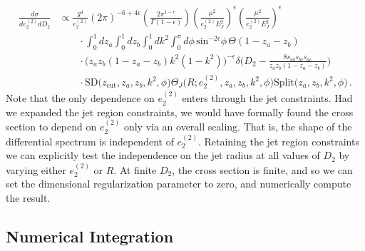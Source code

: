 \documentclass[a4paper,11pt]{article}
\newcommand{\ecf}[2]{e_{#1}^{(#2)}}
\newcommand{\nn}{\nonumber}
\def\zcut{z_{\text{cut}}}
\begin{document}
{\small\begin{align}
\frac{d\sigma}{d\ecf{2}{2} dD_2}&\propto \frac{g^4}{\ecf{2}{2}}(2\pi)^{-6+4\epsilon}\left(\frac{2\pi^{1-\epsilon}}{\Gamma(1-\epsilon)}\right)\left(\frac{\mu^2}{\ecf{2}{2}E_J^2}\right)^{\epsilon}\left(\frac{\mu^2}{\ecf{2}{2}E_J^2}\right)^{\epsilon} \nn \\
&\qquad \cdot \int_0^1dz_a\int_0^1dz_b\int_0^1dk^2\int_0^{\pi}d\phi\,\text{sin}^{-2\epsilon}\phi\,\Theta(1-z_a-z_b)\nonumber\\
&\qquad \cdot\Big(z_az_b(1-z_a-z_b)k^2(1-k^2)\Big)^{-\epsilon}\delta\Bigg(D_2-\frac{8s_{ab}s_{bc}s_{ac}}{z_az_b(1-z_a-z_b)}\Bigg)\nonumber\\
&\qquad\cdot\text{SD}\Big(\zcut,z_a,z_b,k^2,\phi\Big)\Theta_{J}\Big(R;\ecf{2}{2},z_a,z_b,k^2,\phi\Big)\text{Split}\Big(z_a,z_b,k^2,\phi\Big)\,.
\end{align}}
Note that the only dependence on $\ecf{2}{2}$ enters through the jet constraints. Had we expanded the jet region constraints, we would have formally found the cross section to depend on $\ecf{2}{2}$ only via an overall scaling.  That is, the shape of the differential spectrum is independent of $\ecf{2}{2}$. Retaining the jet region constraints we can explicitly test the independence on the jet radius at all values of $D_2$ by varying either $\ecf{2}{2}$ or $R$. At finite $D_2$, the cross section is finite, and so we can set the dimensional regularization parameter to zero, and numerically compute the result.

\subsection{Numerical Integration}
\end{document}
